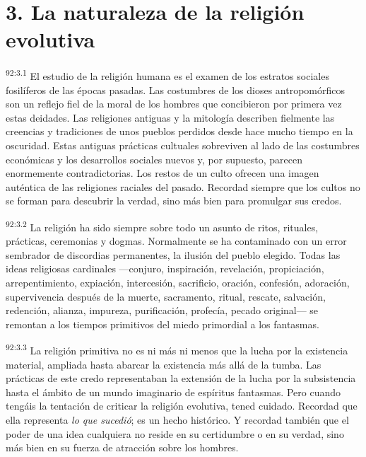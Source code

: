 \documentclass[twoside, 11pt]{book}
\begin{document}
\section*{3. La naturaleza de la religión evolutiva}
\par
\textsuperscript{92:3.1} El estudio de la religión humana es el examen de los estratos sociales fosilíferos de las épocas pasadas. Las costumbres de los dioses antropomórficos son un reflejo fiel de la moral de los hombres que concibieron por primera vez estas deidades. Las religiones antiguas y la mitología describen fielmente las creencias y tradiciones de unos pueblos perdidos desde hace mucho tiempo en la oscuridad. Estas antiguas prácticas cultuales sobreviven al lado de las costumbres económicas y los desarrollos sociales nuevos y, por supuesto, parecen enormemente contradictorias. Los restos de un culto ofrecen una imagen auténtica de las religiones raciales del pasado. Recordad siempre que los cultos no se forman para descubrir la verdad, sino más bien para promulgar sus credos.

\par
\textsuperscript{92:3.2} La religión ha sido siempre sobre todo un asunto de ritos, rituales, prácticas, ceremonias y dogmas. Normalmente se ha contaminado con un error sembrador de discordias permanentes, la ilusión del pueblo elegido. Todas las ideas religiosas cardinales ---conjuro, inspiración, revelación, propiciación, arrepentimiento, expiación, intercesión, sacrificio, oración, confesión, adoración, supervivencia después de la muerte, sacramento, ritual, rescate, salvación, redención, alianza, impureza, purificación, profecía, pecado original--- se remontan a los tiempos primitivos del miedo primordial a los fantasmas.

\par
\textsuperscript{92:3.3} La religión primitiva no es ni más ni menos que la lucha por la existencia material, ampliada hasta abarcar la existencia más allá de la tumba. Las prácticas de este credo representaban la extensión de la lucha por la subsistencia hasta el ámbito de un mundo imaginario de espíritus fantasmas. Pero cuando tengáis la tentación de criticar la religión evolutiva, tened cuidado. Recordad que ella representa \textit{lo que sucedió}; es un hecho histórico. Y recordad también que el poder de una idea cualquiera no reside en su certidumbre o en su verdad, sino más bien en su fuerza de atracción sobre los hombres.
\end{document}
